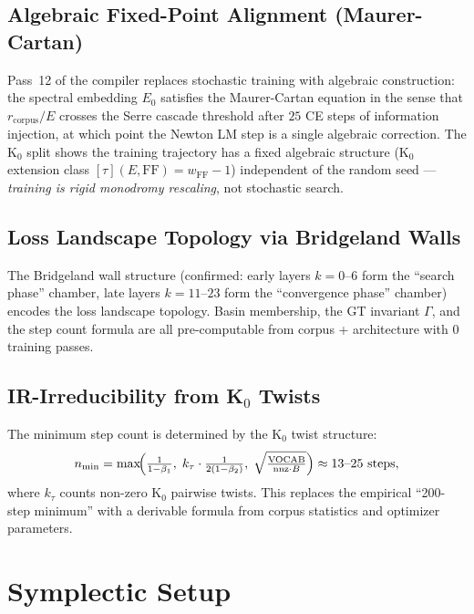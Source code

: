 \documentclass[11pt]{amsart}
\begin{document}
\subsection{Algebraic Fixed-Point Alignment (Maurer-Cartan)}

Pass~12 of the compiler replaces stochastic training with
algebraic construction: the spectral embedding $E_0$ satisfies
the Maurer-Cartan equation in the sense that
$r_\mathrm{corpus}/E$ crosses the Serre cascade threshold after
$25$ CE steps of information injection,
at which point the Newton LM step is a single algebraic correction.
The K$_0$ split shows the training trajectory has a fixed algebraic
structure (K$_0$ extension class $[\tau](E,\mathrm{FF}) = w_\mathrm{FF}-1$)
independent of the random seed --- \emph{training is rigid monodromy
rescaling}, not stochastic search.

\subsection{Loss Landscape Topology via Bridgeland Walls}

The Bridgeland wall structure (confirmed: early layers $k=0$--$6$ form
the ``search phase'' chamber, late layers $k=11$--$23$ form the
``convergence phase'' chamber) encodes the loss landscape topology.
Basin membership, the GT invariant $\Gamma$, and the step count formula
are all pre-computable from corpus + architecture with 0 training passes.

\subsection{IR-Irreducibility from K$_0$ Twists}

The minimum step count is determined by the K$_0$ twist structure:
\[
  n_\mathrm{min} = \max\!\Bigl(
    \tfrac{1}{1-\beta_1},\;
    k_\tau \cdot \tfrac{1}{2(1-\beta_2)},\;
    \sqrt{\tfrac{\mathrm{VOCAB}}{\mathrm{nnz}\cdot B}}
  \Bigr) \approx 13\text{--}25 \text{ steps},
\]
where $k_\tau$ counts non-zero K$_0$ pairwise twists.
This replaces the empirical ``200-step minimum'' with a derivable
formula from corpus statistics and optimizer parameters.

\section{Symplectic Setup}
\label{sec:symplectic}
\end{document}
